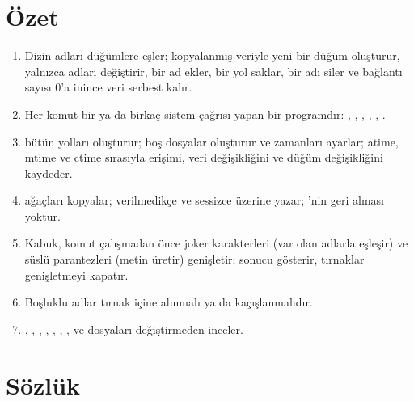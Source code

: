 \section{Özet}

\begin{keyidea}
\begin{enumerate}[leftmargin=1.4em]
  \item Dizin adları düğümlere eşler;  kopyalanmış veriyle yeni bir düğüm oluşturur,  yalnızca adları değiştirir,  bir ad ekler,  bir yol saklar,  bir adı siler ve bağlantı sayısı $0$'a inince veri serbest kalır.
  \item Her komut bir ya da birkaç sistem çağrısı yapan bir programdır: , , , , , .
  \item {} bütün yolları oluşturur;  boş dosyalar oluşturur ve zamanları ayarlar; atime, mtime ve ctime sırasıyla erişimi, veri değişikliğini ve düğüm değişikliğini kaydeder.
  \item {} ağaçları kopyalar;  verilmedikçe  ve  sessizce üzerine yazar; 'nin geri alması yoktur.
  \item Kabuk, komut çalışmadan önce joker karakterleri (var olan adlarla eşleşir) ve süslü parantezleri (metin üretir) genişletir;  sonucu gösterir, tırnaklar genişletmeyi kapatır.
  \item Boşluklu adlar tırnak içine alınmalı ya da kaçışlanmalıdır.
  \item {}, , , , , , ,  ve  dosyaları değiştirmeden inceler.
\end{enumerate}
\end{keyidea}

\section{Sözlük}

